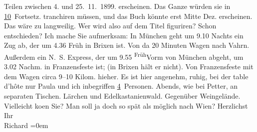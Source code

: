 \begin{ledgroupsized}[t]{13cm}
{{{                  Teilen zwischen 4. und 25. 11. 1899.}}}\label{K_L00973-1h} erscheinen.
               Das Ganze würden sie in \uline{10} Fortsetz. tranchiren
               müssen, und das Buch könnte erst Mitte Dez. erscheinen. Das wäre zu langweilig. Wer
               wird also auf dem Titel figuriren? Schon entschieden? Ich {\pb}mache Sie aufmerksam: In München geht um 9.10 Nachts ein Zug
               ab, der um 4.36 Früh in Brixen ist. Von da 20
               Minuten Wagen nach Vahrn. Außerdem ein N. S. Express, der um
                  9.55{ }\substVorne{}\textsuperscript{Früh}\substDazwischen{}Vorm\substHinten{} von München abgeht, um 3.02
                  Nachm. in Franzensfeste ist;  (in Brixen
               hält er nicht). Von Franzensfeste mit dem Wagen
               circa 9–10 Kilom. hieher. Es ist hier angenehm, ruhig, bei der table d’hôte nur Paula und ich inbegriffen \uline{4} Personen. Abends, wie bei Petter,
               an separaten Tischen. Lärchen und Edelkastanienwald. Gegenüber Weingelände.
               Vielleicht ko{\geminationm}en Sie? Man soll ja doch so spät als
               möglich nach Wien?\pend
           \pstart
           Herzlichst{\\[\baselineskip]}Ihr{\\[\baselineskip]}\spacefill\mbox{Richard}\pend
           \leftskip=0em{}
         
         \endnumbering{}\end{ledgroupsized}  \newcommand{\dateiname}{L00973}\newcommand{\titel}{Richard Beer-Hofmann an Arthur Schnitzler, 12. 9. 1899}\newcommand{\editorInnen}{Martin Anton Müller und Gerd-Hermann Susen}
      
